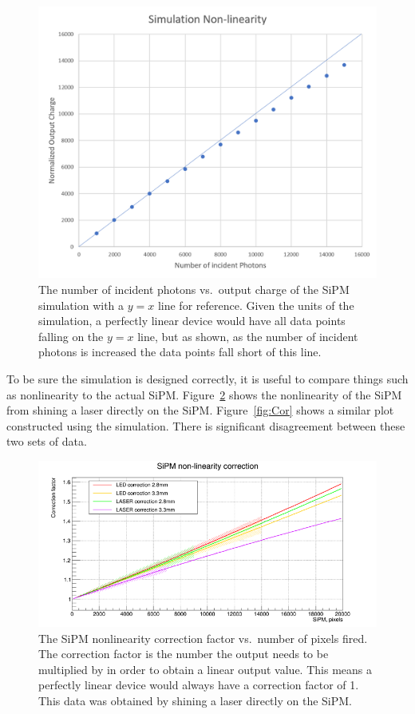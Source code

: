 \begin{figure}
\centering
\includegraphics[width=0.8\linewidth]{Figures/SimNon.png}
\caption{The number of incident photons vs.\ output charge of the SiPM simulation with a $y=x$ line for reference. Given the units of the simulation, a perfectly linear device would have all data points falling on the $y=x$ line, but as shown, as the number of incident photons is increased the data points fall short of this line.}
\label{fig:SimNon}
\end{figure}

To be sure the simulation is designed correctly, it is useful to compare things such as nonlinearity to the actual SiPM. Figure~\ref{fig:NonLin} shows the nonlinearity of the SiPM from shining a laser directly on the SiPM. Figure~\ref{fig:Cor} shows a similar plot constructed using the simulation. There is significant disagreement between these two sets of data.

\begin{figure}
\centering
\includegraphics[width=\linewidth]{Figures/LaserNonLin.png}
\caption{The SiPM nonlinearity correction factor vs.\ number of pixels fired. The correction factor is the number the output needs to be multiplied by in order to obtain a linear output value. This means a perfectly linear device would always have a correction factor of 1. This data was obtained by shining a laser directly on the SiPM.}
\label{fig:NonLin}
\end{figure}

